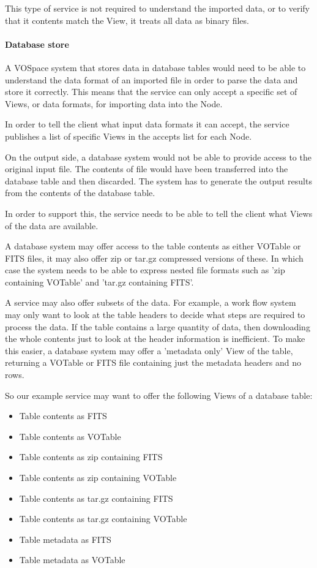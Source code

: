 \documentclass[11pt,a4paper]{ivoa}
\begin{document}
This type of service is not required to understand the imported data, or to verify that it contents match the View, it treats all data as binary files.

\paragraph{Database store}
A VOSpace system that stores data in database tables would need to be able to understand the data format of an imported file in order to parse the data and store it correctly. This means that the service can only accept a specific set of Views, or data formats, for importing data into the Node.

In order to tell the client what input data formats it can accept, the service publishes a list of specific Views in the accepts list for each Node.

On the output side, a database system would not be able to provide access to the original input file. The contents of file would have been transferred into the database table and then discarded. The system has to generate the output results from the contents of the database table.

In order to support this, the service needs to be able to tell the client what Views of the data are available.

A database system may offer access to the table contents as either VOTable or FITS files, it may also offer zip or tar.gz compressed versions of these. In which case the system needs to be able to express nested file formats such as 'zip containing VOTable' and 'tar.gz containing FITS'.

A service may also offer subsets of the data. For example, a work flow system may only want to look at the table headers to decide what steps are required to process the data. If the table contains a large quantity of data, then downloading the whole contents just to look at the header information is inefficient. To make this easier, a database system may offer a 'metadata only' View of the table, returning a VOTable or FITS file containing just the metadata headers and no rows.

So our example service may want to offer the following Views of a database table:

\begin{itemize}
    \item Table contents as FITS
    \item Table contents as VOTable
    \item Table contents as zip containing FITS
    \item Table contents as zip containing VOTable
    \item Table contents as tar.gz containing FITS
    \item Table contents as tar.gz containing VOTable
    \item Table metadata as FITS
    \item Table metadata as VOTable
\end{itemize}
\end{document}
